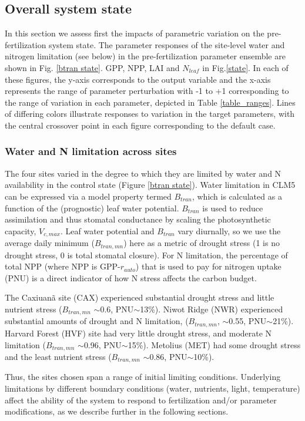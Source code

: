 \documentclass[draft,linenumbers]{agujournal}
\begin{document}
\subsection{Overall system state}
In this section we assess first the impacts of parametric variation on the pre-fertilization system state. The parameter responses of the site-level water and nitrogen limitation (see below) in the pre-fertilization parameter ensemble are shown in Fig. \ref{btran state}. GPP, NPP, LAI and $N_{leaf}$ in Fig.\ref{state}. In each of these figures, the y-axis corresponds to the output variable and the x-axis represents the range of parameter perturbation with -1 to +1 corresponding to the range of variation in each parameter, depicted in Table \ref{table_ranges}. Lines of differing colors illustrate responses to variation in the target parameters, with the central crossover point in each figure corresponding to the default case.

\subsubsection{Water and N limitation across sites}
The four sites varied in the degree to which they are limited by water and N availability in the control state (Figure \ref{btran state}). Water limitation in CLM5 can be expressed via a model property termed $B_{tran}$, which is calculated as a function of the (prognostic) leaf water potential. $B_{tran}$  is used to reduce assimilation and thus stomatal conductance by scaling the photosynthetic capacity, $V_{c,max}$. Leaf water potential and $B_{tran}$ vary diurnally, so we use the average daily minimum ($B_{tran,mn}$) here as a metric of drought stress (1 is no drought stress, 0 is total stomatal closure). For N limitation, the percentage of total NPP (where NPP is GPP-$r_{auto}$) that is used to pay for nitrogen uptake (PNU) is a direct indicator of how N stress affects the carbon budget. 

The Caxiuan\~a site (CAX) experienced substantial drought stress and little nutrient stress ($B_{tran,mn}$ $\sim$0.6, PNU$\sim$13\%). Niwot Ridge (NWR) experienced substantial amounts of drought and N limitation, ($B_{tran,mn}$, $\sim$0.55, PNU$\sim$21\%). Harvard Forest (HVF) site had very little drought stress, and moderate N limitation ($B_{tran,mn}$ $\sim$0.96, PNU$\sim$15\%).  Metolius (MET)  had some drought stress and the least nutrient stress ($B_{tran,mn}$ $\sim$0.86, PNU$\sim$10\%).  

Thus, the sites chosen span a range of initial limiting conditions. Underlying limitations by different boundary conditions (water, nutrients, light, temperature) affect the ability of the system to respond to fertilization and/or parameter modifications, as we describe further in the following sections. 
\end{document}
